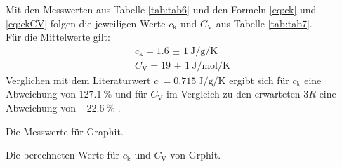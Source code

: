 Mit den Messwerten aus Tabelle \ref{tab:tab6} und den Formeln \eqref{eq:ck} und \eqref{eq:ckCV} folgen die jeweiligen Werte $c_\text{k}$ und $C_\text{V}$ aus Tabelle \ref{tab:tab7}.\\

Für die Mittelwerte gilt:
\begin{align*}
	c_\text{k} = \SI{1,6(1)}{\joule\per\gram\per\kelvin} \\
	C_\text{V} = \SI{19(1)}{\joule\per\mol\per\kelvin}
\end{align*}
Verglichen mit dem Literaturwert $c_\text{l}=\SI{0,715}{\joule\per\gram\per\kelvin}$ \cite{clit} ergibt sich für $c_\text{k}$ eine Abweichung von $\SI{127,1}{\percent}$ und für $C_\text{V}$ im Vergleich zu den erwarteten $3R$ eine Abweichung von $\SI{-22,6}{\percent}$ .

\begin{table}
	\centering
	\caption{Die Messwerte für Graphit.}
	
	\label{tab:tab6}
\end{table}

\begin{table}
	\centering
	\caption{Die berechneten Werte für $c_\text{k}$ und $C_\text{V}$ von Grphit.}
	
	\label{tab:tab7}
\end{table}

